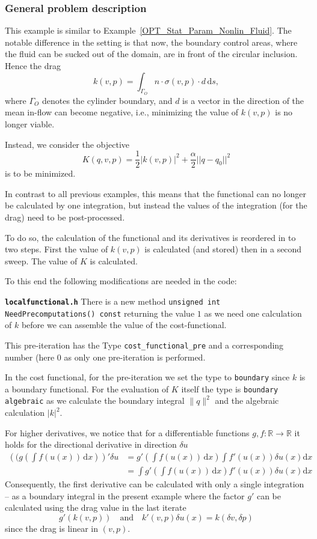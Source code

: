 \subsubsection{General problem description}
This example is similar to Example~\ref{OPT_Stat_Param_Nonlin_Fluid}.
The notable difference in the setting is that now, the boundary control areas, 
where the fluid can be sucked out of the domain, are in front of the 
circular inclusion. Hence the drag
\[
k(v,p) = \int_{\Gamma_O} n\cdot \sigma(v,p)\cdot d \, \mathrm{d}s,
\]
where $\Gamma_O$ denotes the cylinder boundary, and $d$ is a vector in the
direction of the mean in-flow can become negative, i.e., minimizing the 
value of $k(v,p)$ is no longer viable. 

Instead, we consider the objective 
\[
K(q,v,p) = \frac{1}{2}|k(v,p)|^2 + \frac{\alpha}{2}||q - q_0||^2
\] 
is to be minimized.

In contrast to all previous examples, this means that the functional can
no longer be calculated by one integration, but instead the values of the 
integration (for the drag) need to be post-processed.

To do so, the calculation of the functional and its derivatives
is reordered in to two steps. First the value of $k(v,p)$ is
calculated (and stored) then in a second sweep. The value of
$K$ is calculated.

To this end the following modifications are needed in the
code:


\textbf{\texttt{localfunctional.h}}
There is a new method \texttt{unsigned int NeedPrecomputations() const}
returning the value $1$ as we need one calculation of $k$ before we can
assemble the value of the cost-functional.

This pre-iteration has the Type \texttt{cost\_functional\_pre} and a corresponding
number (here $0$ as only one pre-iteration is performed.

In the cost functional, for the pre-iteration we set the type to
\texttt{boundary} since $k$ is a boundary functional.
For the evaluation of $K$ itself the type is \texttt{boundary algebraic}
as we calculate the boundary integral $\|q\|^2$ and the algebraic calculation
$|{k}|^2$.

For higher derivatives, we notice that for a differentiable functions $g,f\colon \mathbb R\rightarrow \mathbb R$
it holds for the directional derivative in direction $\delta u$
\begin{align*}
 \left((g\left(\int f(u(x))\,\mathrm{d}x\right)\right)'\delta u
  &= g'(\int f(u(x))\,\mathrm{d}x) \int f'(u(x)) \delta u(x) \mathrm{d}x \\
  &= \int g'(\int f(u(x))\,\mathrm{d}x) f'(u(x)) \delta u(x) \mathrm{d}x 
\end{align*}
Consequently, the first derivative can be calculated with only a single integration
-- as a boundary integral in the present example where the 
factor $g'$ can be calculated using the drag value in the 
last iterate  
\[
g'(k(v,p)) \quad\text{and}\quad k'(v,p)\delta u(x) = k(\delta v, \delta p)
\]
since the drag is linear in $(v,p)$.

